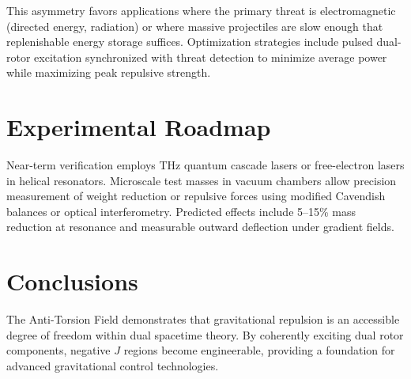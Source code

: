 \documentclass[dvipdfmx,11pt,a4paper]{article}
\theoremstyle{definition}
\begin{document}
This asymmetry favors applications where the primary threat is electromagnetic (directed energy, radiation) or where massive projectiles are slow enough that replenishable energy storage suffices. Optimization strategies include pulsed dual-rotor excitation synchronized with threat detection to minimize average power while maximizing peak repulsive strength.

\section{Experimental Roadmap}

Near-term verification employs THz quantum cascade lasers or free-electron lasers in helical resonators. Microscale test masses in vacuum chambers allow precision measurement of weight reduction or repulsive forces using modified Cavendish balances or optical interferometry. Predicted effects include 5--15\% mass reduction at resonance and measurable outward deflection under gradient fields.

\section{Conclusions}

The Anti-Torsion Field demonstrates that gravitational repulsion is an accessible degree of freedom within dual spacetime theory. By coherently exciting dual rotor components, negative $J$ regions become engineerable, providing a foundation for advanced gravitational control technologies.
\end{document}
